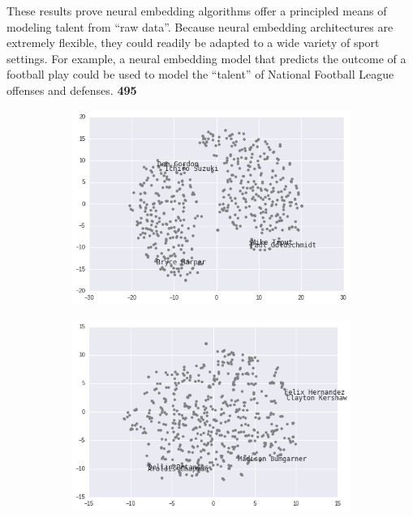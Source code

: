 \documentclass{article}
\begin{document}
These results prove neural embedding algorithms offer a principled means of modeling talent from ``raw data''. Because neural embedding architectures are extremely flexible, they could readily be adapted to a wide variety of sport settings. For example, a neural embedding model that predicts the outcome of a football play could be used to model the ``talent'' of National Football League offenses and defenses. \textbf{495}

\begin{figure}[h]
\centering
\begin{minipage}{.5\textwidth}
\captionsetup[subfigure]{labelformat=empty}
\centering

    \begin{subfigure}[b]{0.75\textwidth}
    \includegraphics[width=1\linewidth]{batter_tsne.png}
    \caption{}
    \end{subfigure}

    \begin{subfigure}[b]{0.75\textwidth}
    \includegraphics[width=1\linewidth]{pitcher_tsne.png}
    \caption{}
    \end{subfigure}


\end{minipage}
\end{figure}
\end{document}
